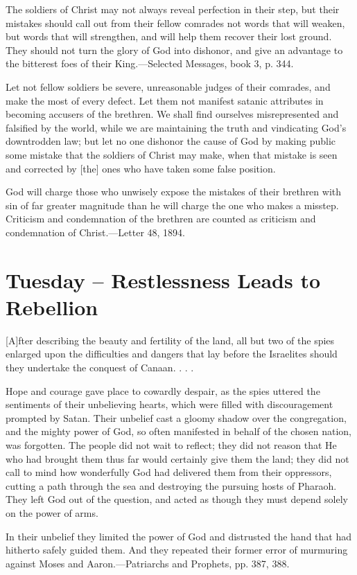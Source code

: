 \documentclass[a4paper, 10pt, twoside, headings=small]{scrartcl}
\begin{document}
\begin{multicols}{2}
The soldiers of Christ may not always reveal perfection in their step, but their mistakes should call out from their fellow comrades not words that will weaken, but words that will strengthen, and will help them recover their lost ground. They should not turn the glory of God into dishonor, and give an advantage to the bitterest foes of their King.—Selected Messages, book 3, p. 344.

Let not fellow soldiers be severe, unreasonable judges of their comrades, and make the most of every defect. Let them not manifest satanic attributes in becoming accusers of the brethren. We shall find ourselves misrepresented and falsified by the world, while we are maintaining the truth and vindicating God’s downtrodden law; but let no one dishonor the cause of God by making public some mistake that the soldiers of Christ may make, when that mistake is seen and corrected by [the] ones who have taken some false position.

God will charge those who unwisely expose the mistakes of their brethren with sin of far greater magnitude than he will charge the one who makes a misstep. Criticism and condemnation of the brethren are counted as criticism and condemnation of Christ.—Letter 48, 1894.

\section*{Tuesday – Restlessness Leads to Rebellion}

[A]fter describing the beauty and fertility of the land, all but two of the spies enlarged upon the difficulties and dangers that lay before the Israelites should they undertake the conquest of Canaan. . . .

Hope and courage gave place to cowardly despair, as the spies uttered the sentiments of their unbelieving hearts, which were filled with discouragement prompted by Satan. Their unbelief cast a gloomy shadow over the congregation, and the mighty power of God, so often manifested in behalf of the chosen nation, was forgotten. The people did not wait to reflect; they did not reason that He who had brought them thus far would certainly give them the land; they did not call to mind how wonderfully God had delivered them from their oppressors, cutting a path through the sea and destroying the pursuing hosts of Pharaoh. They left God out of the question, and acted as though they must depend solely on the power of arms.

In their unbelief they limited the power of God and distrusted the hand that had hitherto safely guided them. And they repeated their former error of murmuring against Moses and Aaron.—Patriarchs and Prophets, pp. 387, 388.


\end{multicols}
\end{document}
